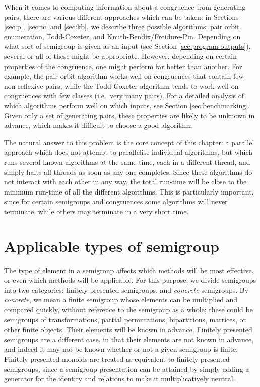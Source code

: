 When it comes to computing information about a congruence from generating pairs,
there are various different approaches which can be taken: in Sections
\ref{sec:p}, \ref{sec:tc} and \ref{sec:kb}, we describe three possible
algorithms: pair orbit enumeration, Todd-Coxeter, and Knuth-Bendix/Froidure-Pin.
Depending on what sort of semigroup is given as an input (see Section
\ref{sec:program-outputs}), several
or all of these might be appropriate.  However, depending on certain properties
of the congruence, one might perform far better than another.  For example, the
pair orbit algorithm works well on congruences that contain few non-reflexive
pairs, while the Todd-Coxeter algorithm tends to work well on congruences with
few classes (i.e.~very many pairs).  For a detailed analysis of which algorithms
perform well on which inputs, see Section \ref{sec:benchmarking}.  Given
only a set of generating pairs, these properties are likely to be unknown in
advance, which makes it difficult to choose a good algorithm.

The natural answer to this problem is the core concept of this chapter: a
parallel approach which does not attempt to parallelise individual algorithms,
but which runs several known algorithms at the same time, each in a different
thread, and simply halts all threads as soon as any one completes.  Since these
algorithms do not interact with each other in any way, the total run-time will
be close to the minimum run-time of all the different algorithms.  This is
particularly important, since for certain semigroups and congruences some
algorithms will never terminate, while others may terminate in a very short
time.

\section{Applicable types of semigroup}
\label{sec:applicable-types-of-semigroup}

The type of element in a semigroup affects which methods will be most effective,
or even which methods will be applicable.  For this purpose, we divide
semigroups into two categories: finitely presented semigroups, and
\textit{concrete} semigroups.  By \textit{concrete}, we mean a finite semigroup
whose elements can be multiplied and compared quickly, without reference to the
semigroup as a whole; these could be semigroups of transformations, partial
permutations, bipartitions, matrices, or other finite objects.  Their elements
will be known in advance.  Finitely presented semigroups are a different case,
in that their elements are not known in advance, and indeed it may not be known
whether or not a given semigroup is finite.  Finitely presented monoids are treated as
equivalent to finitely presented semigroups, since a semigroup presentation can
be attained by simply adding a generator for the identity and relations to make
it multiplicatively neutral.


